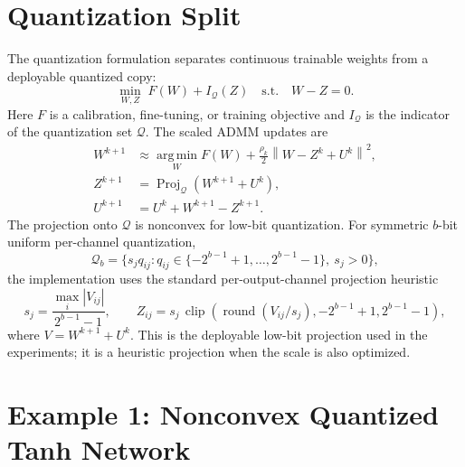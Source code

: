 \documentclass[11pt]{article}
\newcommand{\argmin}{\operatorname*{arg\,min}}
\newcommand{\proj}{\operatorname{Proj}}
\newcommand{\norm}[1]{\left\lVert #1 \right\rVert}
\newcommand{\Q}{\mathcal{Q}}
\begin{document}
\section{Quantization Split}

The quantization formulation separates continuous trainable weights from a
deployable quantized copy:
\begin{equation}
    \min_{W,Z}\; F(W)+I_{\Q}(Z)
    \quad \text{s.t.}\quad W-Z=0.
    \label{eq:quant-split}
\end{equation}
Here \(F\) is a calibration, fine-tuning, or training objective and
\(I_{\Q}\) is the indicator of the quantization set \(\Q\).  The scaled ADMM
updates are
\begin{align}
    W^{k+1}
    &\approx
    \argmin_W
    F(W)+\frac{\rho_k}{2}\norm{W-Z^k+U^k}^2,\\
    Z^{k+1}
    &=
    \proj_{\Q}(W^{k+1}+U^k),\\
    U^{k+1}
    &=U^k+W^{k+1}-Z^{k+1}.
\end{align}
The projection onto \(\Q\) is nonconvex for low-bit quantization.  For
symmetric \(b\)-bit uniform per-channel quantization,
\begin{equation}
    \Q_b
    =
    \{s_j q_{ij}: q_{ij}\in\{-2^{b-1}+1,\ldots,2^{b-1}-1\},
    \ s_j>0\},
\end{equation}
the implementation uses the standard per-output-channel projection heuristic
\begin{equation}
    s_j=\frac{\max_i |V_{ij}|}{2^{b-1}-1},
    \qquad
    Z_{ij}=s_j\,
    \operatorname{clip}\!\left(
    \operatorname{round}(V_{ij}/s_j),-2^{b-1}+1,2^{b-1}-1
    \right),
    \label{eq:uniform-quant-proj}
\end{equation}
where \(V=W^{k+1}+U^k\).  This is the deployable low-bit projection used in the
experiments; it is a heuristic projection when the scale is also optimized.

\section{Example 1: Nonconvex Quantized Tanh Network}
\end{document}
